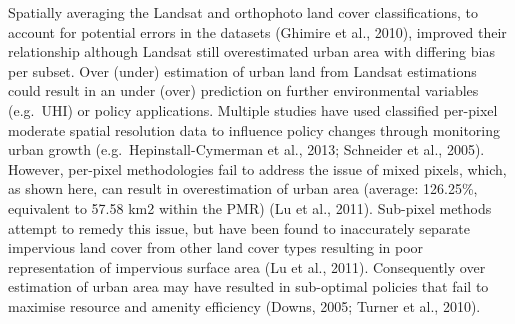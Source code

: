 \documentclass[]{book}
\begin{document}
Spatially averaging the Landsat and orthophoto land cover
classifications, to account for potential errors in the datasets
(Ghimire et al., 2010), improved their relationship although Landsat
still overestimated urban area with differing bias per subset. Over
(under) estimation of urban land from Landsat estimations could result
in an under (over) prediction on further environmental variables
(e.g.~UHI) or policy applications. Multiple studies have used classified
per-pixel moderate spatial resolution data to influence policy changes
through monitoring urban growth (e.g.~Hepinstall-Cymerman et al., 2013;
Schneider et al., 2005). However, per-pixel methodologies fail to
address the issue of mixed pixels, which, as shown here, can result in
overestimation of urban area (average: 126.25\%, equivalent to 57.58 km2
within the PMR) (Lu et al., 2011). Sub-pixel methods attempt to remedy
this issue, but have been found to inaccurately separate impervious land
cover from other land cover types resulting in poor representation of
impervious surface area (Lu et al., 2011). Consequently over estimation
of urban area may have resulted in sub-optimal policies that fail to
maximise resource and amenity efficiency (Downs, 2005; Turner et al.,
2010).
\end{document}
